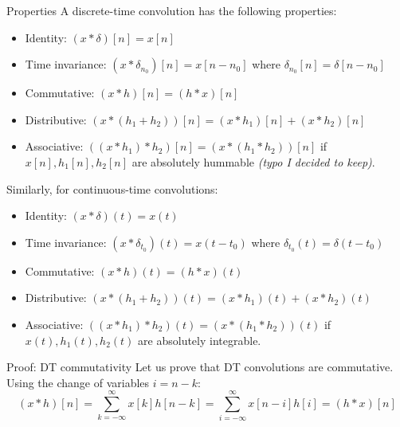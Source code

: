 \documentclass[a4paper]{article}
\begin{document}
\begin{parag}{Properties}
    A discrete-time convolution has the following properties:
    \begin{itemize}
        \item Identity: $\displaystyle \left(x*\delta\right)\left[n\right] = x\left[n\right]$
        \item Time invariance: $\displaystyle \left(x * \delta_{n_0}\right)\left[n\right] = x\left[n - n_0\right]$ where $\delta_{n_0}\left[n\right] = \delta \left[n - n_0\right]$
        \item Commutative: $\displaystyle \left(x*h\right)\left[n\right] = \left(h * x\right)\left[n\right]$
        \item Distributive: $\displaystyle \left(x*\left(h_1 + h_2\right)\right)\left[n\right] = \left(x*h_1\right)\left[n\right] + \left(x *h_2\right)\left[n\right]$
        \item Associative: $\displaystyle \left(\left(x *h_1\right)*h_2\right)\left[n\right] = \left(x * \left(h_1 * h_2\right)\right)\left[n\right]$ if $x\left[n\right], h_1\left[n\right], h_2\left[n\right]$ are absolutely hummable \textit{(typo I decided to keep)}.
    \end{itemize}
    
    Similarly, for continuous-time convolutions:
    \begin{itemize}
        \item Identity: $\displaystyle \left(x*\delta\right)\left(t\right) = x\left(t\right)$
        \item Time invariance: $\displaystyle \left(x * \delta_{t_0}\right)\left(t\right) = x\left(t - t_0\right)$ where $\delta_{t_0}\left(t\right) = \delta \left(t - t_0\right)$
        \item Commutative: $\displaystyle \left(x*h\right)\left(t\right) = \left(h * x\right)\left(t\right)$
        \item Distributive: $\displaystyle \left(x*\left(h_1 + h_2\right)\right)\left(t\right) = \left(x*h_1\right)\left(t\right) + \left(x *h_2\right)\left(t\right)$
        \item Associative: $\displaystyle \left(\left(x *h_1\right)*h_2\right)\left(t\right) = \left(x * \left(h_1 * h_2\right)\right)\left(t\right)$ if $x\left(t\right), h_1\left(t\right), h_2\left(t\right)$ are absolutely integrable.
    \end{itemize}

    \begin{subparag}{Proof: DT commutativity}
        Let us prove that DT convolutions are commutative. Using the change of variables $i = n -k$:
        \[\left(x*h\right)\left[n\right] = \sum_{k=-\infty}^{\infty} x\left[k\right]h\left[n-k\right] =  \sum_{i=-\infty}^{\infty} x\left[n-i\right]h\left[i\right] = \left(h*x\right)\left[n\right]\]


\end{subparag}
\end{parag}
\end{document}
